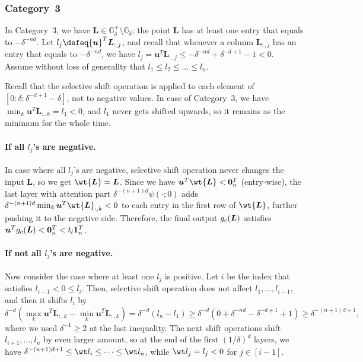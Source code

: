 \documentclass{article} %
\def\vzero{{\bm{0}}}
\def\vone{{\bm{1}}}
\def\vu{{\bm{u}}}
\def\mL{{\bm{L}}}
\def\sG{{\mathbb{G}}}
\begin{document}
\subsubsection{Category~3}
In Category~3, we have $\mL \in \sG^+_{\delta} \setminus \sG_{\delta}$; the point $\mL$ has at least one entry that equals to $-\delta^{-nd}$.
Let $l_j \defeq \vu^T \mL_{:,j}$, and recall that whenever a column $\mL_{:,j}$ has an entry that equals to $-\delta^{-nd}$, we have $l_j = \vu^T \mL_{:,j} \leq -\delta^{-nd} + \delta^{-d+1} - 1 < 0$.
Assume without loss of generality that $l_1 \leq l_2 \leq \dots \leq l_n$.

Recall that the selective shift operation is applied to each element of $[0:\delta:\delta^{-d+1}-\delta]$, not to negative values.
In case of Category~3, we have $\min_k \vu^T \mL_{:,k} = l_1 < 0$, and $l_1$ never gets shifted upwards, so it remains as the minimum for the whole time.

\paragraph{If all $l_j$'s are negative.}
In case where all $l_j$'s are negative, selective shift operation never changes the input $\mL$, so we get $\wt \mL = \mL$. Since we have $\vu^T \wt \mL < \vzero_n^T$ (entry-wise), the last layer with attention part $\delta^{-(n+1)d} \psi(\cdot;0)$ adds $\delta^{-(n+1)d} \min_k \vu^T \wt \mL_{:,k} < 0$ to each entry in the first row of $\wt \mL$, further pushing it to the negative side. Therefore, the final output $g_{\rm c}(\mL)$ satisfies $\vu^T g_{\rm c}(\mL) < \vzero_n^T < t_l\vone_n^T$.

\paragraph{If not all $l_j$'s are negative.}
Now consider the case where at least one $l_j$ is positive. Let $i$ be the index that satisfies $l_{i-1} < 0 \leq l_{i}$. Then, selective shift operation does not affect $l_1, \dots, l_{i-1}$, and then it shifts $l_{i}$ by
\begin{equation*}
    \delta^{-d}(\max_k \vu^T \mL_{:,k} - \min_k \vu^T \mL_{:,k})
    = \delta^{-d} (l_n - l_1)
    \geq \delta^{-d} (0 + \delta^{-nd} - \delta^{-d+1} + 1)
    \geq \delta^{-(n+1)d+1},
\end{equation*}
where we used $\delta^{-1} \geq 2$ at the last inequality.
The next shift operations shift $l_{i+1}, \dots, l_n$ by even larger amount, so at the end of the first $(1/\delta)^d$ layers, we have 
$\delta^{-(n+1)d+1} \leq \wt l_{i} \leq \dots \leq \wt l_n$,
while $\wt l_j = l_j < 0$ for $j \in [i-1]$.
\end{document}
